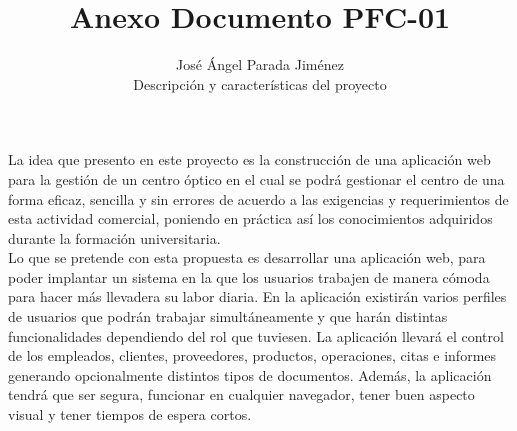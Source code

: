 \documentclass[a4paper,12pt]{article}
\title{Anexo Documento PFC-01}
\author{José Ángel Parada Jiménez\\ Descripción y características del proyecto}
\date{}
\begin{document}
 \maketitle 

La idea que presento en este proyecto es la construcción de una aplicación web para la gestión de un centro óptico en el cual se podrá gestionar el centro de una forma eficaz, sencilla y sin errores de acuerdo a las exigencias y requerimientos de esta actividad comercial, poniendo en práctica así los conocimientos adquiridos durante la formación universitaria.\\
Lo que se pretende con esta propuesta es desarrollar una aplicación web, para poder implantar un sistema en la que los usuarios trabajen de manera cómoda para hacer más llevadera su labor diaria.  En la aplicación existirán varios perfiles de usuarios que podrán trabajar simultáneamente y que harán distintas funcionalidades dependiendo del rol que tuviesen. La aplicación llevará el control de los empleados, clientes, proveedores, productos, operaciones, citas e informes generando opcionalmente distintos tipos de documentos. Además, la aplicación tendrá que ser segura, funcionar en cualquier navegador, tener buen aspecto visual y tener tiempos de espera cortos.
 
\end{document}

